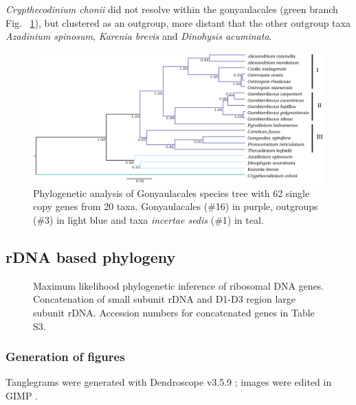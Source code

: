 \documentclass[12pt]{article}
\begin{document}
\emph{Crypthecodinium chonii} did not resolve within the gonyaulacales (green branch Fig. ~\ref{fig:phylo}), but clustered as an outgroup, more distant that the other outgroup taxa \emph{Azadinium spinosum}, \emph{Karenia brevis} and \emph{Dinohysis acuminata}.
\FloatBarrier 
\begin{figure} 
\includegraphics[scale=.25]{Aug2_20-taxa-combined-fig_MCC_trees_gimp.png} 
\caption{Phylogenetic analysis of Gonyaulacales species tree with 62 single copy genes from 20 taxa. Gonyaulacales (\#16) in purple, outgroups (\#3) in light blue and taxa \textit{incertae sedis} (\#1) in teal.} 
\label{fig:phylo}
\end{figure} 
\FloatBarrier

\subsection*{rDNA based phylogeny}
\FloatBarrier 
\begin{figure} 
\caption{Maximum likelihood phylogenetic inference of ribosomal DNA genes. Concatenation of small subunit rDNA and D1-D3 region large subunit rDNA. Accession numbers for concatenated genes in Table S3.} 
\label{fig:rdna}
\end{figure} 
\FloatBarrier

\subsubsection*{Generation of figures}
Tanglegrams were generated with Dendroscope v3.5.9 \cite{huson2007dendroscope}; images were edited in GIMP \cite{gimp}.
\newpage
\end{document}
